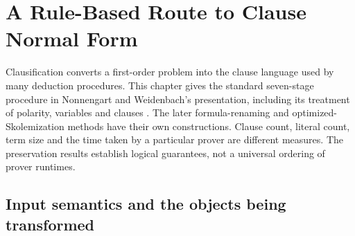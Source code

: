 \chapter{A Rule-Based Route to Clause Normal Form}
\label{sec:p12-small-clause-standard}

Clausification converts a first-order problem into the clause language
used by many deduction procedures. This chapter gives the standard
seven-stage procedure in Nonnengart and Weidenbach's presentation,
including its treatment of polarity, variables and clauses
\cite[secs.~1--3, pp.~337--347]{NonnengartWeidenbach2001SmallClauses}.
The later formula-renaming and optimized-Skolemization methods have
their own constructions. Clause count, literal count, term size and
the time taken by a particular prover are different measures.
The preservation results establish logical guarantees, not a
universal ordering of prover runtimes.

\section{Input semantics and the objects being transformed}

